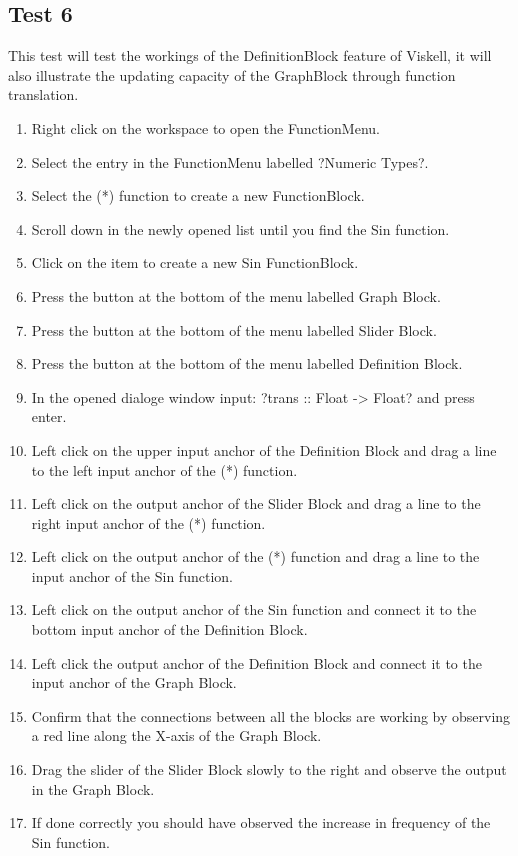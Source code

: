 	\subsection{Test 6}
		This test will test the workings of the DefinitionBlock feature of Viskell, it will also illustrate the updating capacity of the GraphBlock through function translation.

		\begin{enumerate}
			\item Right click on the workspace to open the FunctionMenu.
			\item Select the entry in the FunctionMenu labelled ?Numeric Types?.
			\item Select the (*) function to create a new FunctionBlock.
			\item	Scroll down in the newly opened list until you find the Sin function.
			\item Click on the item to create a new Sin FunctionBlock.
			\item Press the button at the bottom of the menu labelled Graph Block.
			\item Press the button at the bottom of the menu labelled Slider Block.
			\item Press the button at the bottom of the menu labelled Definition Block.
			\item In the opened dialoge window input: ?trans :: Float -> Float? and press enter.
			\item Left click on the upper input anchor of the Definition Block and drag a line to the left input anchor of the (*) function.
			\item Left click on the output anchor of the Slider Block and drag a line to the right input anchor of the (*) function.
			\item Left click on the output anchor of the (*) function and drag a line to the input anchor of the Sin function.
			\item Left click on the output anchor of the Sin function and connect it to the bottom input anchor of the Definition Block.
			\item Left click the output anchor of the Definition Block and connect it to the input anchor of the Graph Block.
			\item Confirm that the connections between all the blocks are working by observing a red line along the X-axis of the Graph Block.
			\item Drag the slider of the Slider Block slowly to the right and observe the output in the Graph Block.
			\item If done correctly you should have observed the increase in frequency of the Sin function.
		\end{enumerate}

